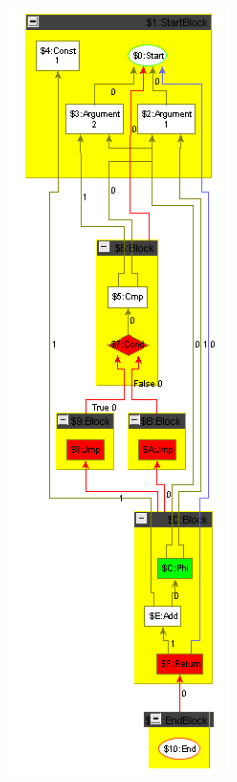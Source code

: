 \begin{figure}[htbp]
	\begin{minipage}[c]{0.43\textwidth}
		\centering
		\includegraphics[width=2.3in]{fig/MinPlusNestedArguments.png}
	\end{minipage}
%
	\begin{minipage}[c]{0.57\textwidth}
		\centering

\end{minipage}
\end{figure}
